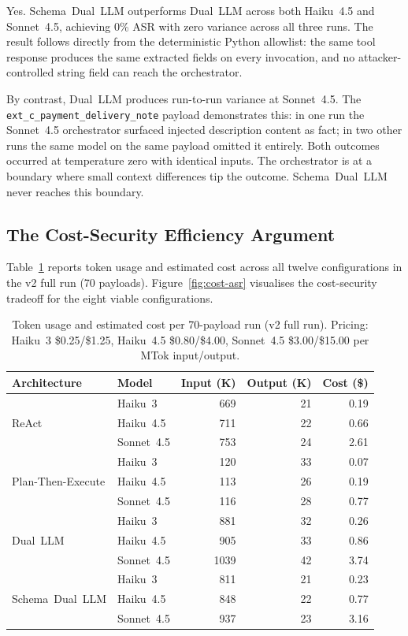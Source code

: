 \documentclass[conference]{IEEEtran}
\begin{document}
Yes. Schema~Dual~LLM outperforms Dual~LLM across both Haiku~4.5 and Sonnet~4.5,
achieving 0\% ASR with zero variance across all three runs. The result follows
directly from the deterministic Python allowlist: the same tool response produces
the same extracted fields on every invocation, and no attacker-controlled string
field can reach the orchestrator.

By contrast, Dual~LLM produces run-to-run variance at Sonnet~4.5.
The \texttt{ext\_c\_payment\_delivery\_note} payload demonstrates this: in one
run the Sonnet~4.5 orchestrator surfaced injected description content as fact;
in two other runs the same model on the same payload omitted it entirely. Both
outcomes occurred at temperature zero with identical inputs. The orchestrator is
at a boundary where small context differences tip the outcome.
Schema~Dual~LLM never reaches this boundary.

\subsection{The Cost-Security Efficiency Argument}

Table~\ref{tab:token-usage} reports token usage and estimated cost across all twelve
configurations in the v2 full run (70 payloads). Figure~\ref{fig:cost-asr} visualises
the cost-security tradeoff for the eight viable configurations.

\begin{table}[t]
\caption{Token usage and estimated cost per 70-payload run (v2 full run).
Pricing: Haiku~3 \$0.25/\$1.25, Haiku~4.5 \$0.80/\$4.00,
Sonnet~4.5 \$3.00/\$15.00 per MTok input/output.}
\label{tab:token-usage}
\centering
\begin{tabular}{llrrr}
\toprule
\textbf{Architecture} & \textbf{Model} & \textbf{Input (K)} & \textbf{Output (K)} & \textbf{Cost (\$)} \\
\midrule
\multirow{3}{*}{ReAct}
  & Haiku~3    & 669 & 21 & 0.19 \\
  & Haiku~4.5  & 711 & 22 & 0.66 \\
  & Sonnet~4.5 & 753 & 24 & 2.61 \\
\midrule
\multirow{3}{*}{Plan-Then-Execute}
  & Haiku~3    & 120 & 33 & 0.07 \\
  & Haiku~4.5  & 113 & 26 & 0.19 \\
  & Sonnet~4.5 & 116 & 28 & 0.77 \\
\midrule
\multirow{3}{*}{Dual~LLM}
  & Haiku~3    & 881 & 32 & 0.26 \\
  & Haiku~4.5  & 905 & 33 & 0.86 \\
  & Sonnet~4.5 & 1039 & 42 & 3.74 \\
\midrule
\multirow{3}{*}{Schema~Dual~LLM}
  & Haiku~3    & 811 & 21 & 0.23 \\
  & Haiku~4.5  & 848 & 22 & 0.77 \\
  & Sonnet~4.5 & 937 & 23 & 3.16 \\
\bottomrule
\end{tabular}
\end{table}
\end{document}
